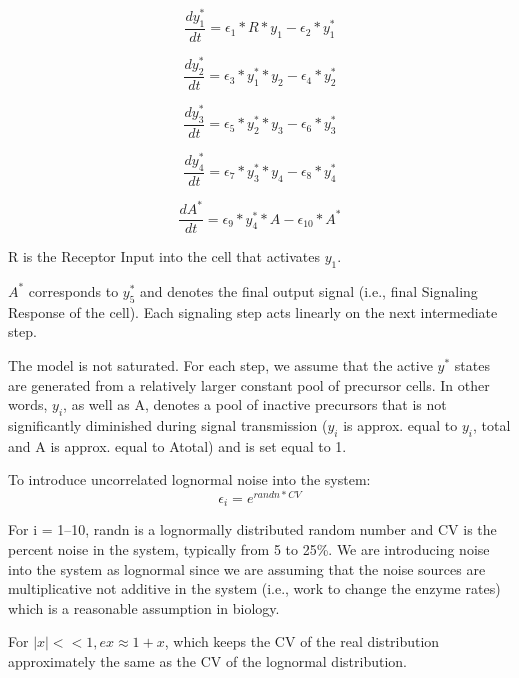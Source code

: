 \begin{equation}\label{paper1_eq1}
\frac{dy_1^*}{dt} = \epsilon_1 * R * y_1 - \epsilon_2 * y_1^*
\end{equation}

\begin{equation}\label{paper1_eq2}
\frac{dy_2^*}{dt} = \epsilon_3 * y_1^* * y_2 - \epsilon_4 * y_2^*
\end{equation}

\begin{equation}\label{paper1_eq3}
\frac{dy_3^*}{dt} = \epsilon_5 * y_2^* * y_3 - \epsilon_6 * y_3^*
\end{equation}

\begin{equation}\label{paper1_eq4}
\frac{dy_4^*}{dt} = \epsilon_7 * y_3^* * y_4 - \epsilon_8 * y_4^*
\end{equation}

\begin{equation}\label{paper1_eq5}
\frac{dA^*}{dt} = \epsilon_9 * y_4^* * A - \epsilon_10 * A^*
\end{equation}


R is the Receptor Input into the cell that activates $y_1$.

$A^*$ corresponds to $y_5^*$ and denotes the final output signal (i.e., final Signaling Response of the cell). Each signaling step acts linearly on the next intermediate step.

The model is not saturated. For each step, we assume that the active $y^*$ states are generated from a relatively larger constant pool of precursor cells. In other words, $y_i$, as well as A, denotes a pool of inactive precursors that is not significantly diminished during signal transmission ($y_i$ is approx. equal to $y_i$, total and A is approx. equal to Atotal) and is set equal to 1.

To introduce uncorrelated lognormal noise into the system:
\begin{equation}\label{paper1_eq6}
\epsilon_i = e^{randn*CV}
\end{equation}

For i = 1–10, randn is a lognormally distributed random number and CV is the percent noise in the system, typically from 5 to 25\%. We are introducing noise into the system as lognormal since we are assuming that the noise sources are multiplicative not additive in the system (i.e., work to change the enzyme rates) which is a reasonable assumption in biology.

For $|x| << 1, ex \approx 1 + x$, which keeps the CV of the real distribution approximately the same as the CV of the lognormal distribution.

